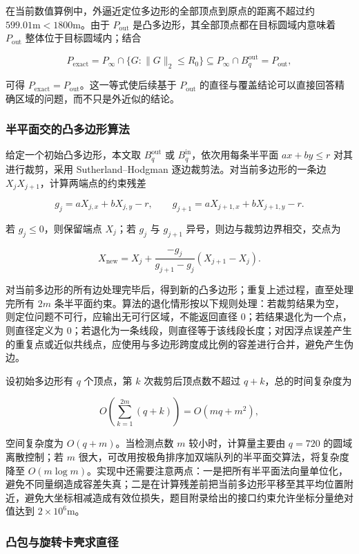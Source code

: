 在当前数值算例中，外逼近定位多边形的全部顶点到原点的距离不超过约 $599.01\mathrm{m}<1800\mathrm{m}$。由于 $P_{\mathrm{out}}$ 是凸多边形，其全部顶点都在目标圆域内意味着 $P_{\mathrm{out}}$ 整体位于目标圆域内；结合

\[
P_{\mathrm{exact}}
=
P_\infty\cap\{G:\lVert G\rVert_2\le R_0\}
\subseteq
P_\infty\cap B_q^{\mathrm{out}}
=
P_{\mathrm{out}},
\]

可得 $P_{\mathrm{exact}}=P_{\mathrm{out}}$。这一等式使后续基于 $P_{\mathrm{out}}$ 的直径与覆盖结论可以直接回答精确区域的问题，而不只是外近似的结论。

\subsubsection{半平面交的凸多边形算法}

给定一个初始凸多边形，本文取 $B_q^{\mathrm{out}}$ 或 $B_q^{\mathrm{in}}$，依次用每条半平面 $ax+by\le r$ 对其进行裁剪，采用 Sutherland–Hodgman 逐边裁剪法\cite{sutherland1974}。对当前多边形的一条边 $X_jX_{j+1}$，计算两端点的约束残差

\[
g_j=aX_{j,x}+bX_{j,y}-r,
\qquad
g_{j+1}=aX_{j+1,x}+bX_{j+1,y}-r.
\]

若 $g_j\le0$，则保留端点 $X_j$；若 $g_j$ 与 $g_{j+1}$ 异号，则边与裁剪边界相交，交点为

\[
X_{\mathrm{new}}
=
X_j+
\frac{-g_j}{g_{j+1}-g_j}
\left(X_{j+1}-X_j\right).
\]

对当前多边形的所有边处理完毕后，得到新的凸多边形；重复上述过程，直至处理完所有 $2m$ 条半平面约束。算法的退化情形按以下规则处理：若裁剪结果为空，则定位问题不可行，应输出无可行区域，不能返回直径 $0$；若结果退化为一个点，则直径定义为 $0$；若退化为一条线段，则直径等于该线段长度；对因浮点误差产生的重复点或近似共线点，应使用与多边形跨度成比例的容差进行合并，避免产生伪边。

设初始多边形有 $q$ 个顶点，第 $k$ 次裁剪后顶点数不超过 $q+k$，总的时间复杂度为

\[
O\left(\sum_{k=1}^{2m}\left(q+k\right)\right)
=
O\left(mq+m^2\right),
\]

空间复杂度为 $O(q+m)$。当检测点数 $m$ 较小时，计算量主要由 $q=720$ 的圆域离散控制；若 $m$ 很大，可改用按极角排序加双端队列的半平面交算法，将复杂度降至 $O(m\log m)$。实现中还需要注意两点：一是把所有半平面法向量单位化，避免不同量纲造成容差失真；二是在计算残差前把当前多边形平移至其平均位置附近，避免大坐标相减造成有效位损失，题目附录给出的接口约束允许坐标分量绝对值达到 $2\times10^6\mathrm{m}$。

\subsubsection{凸包与旋转卡壳求直径}


